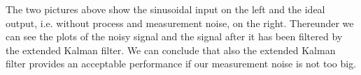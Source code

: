 The two pictures above show the sinusoidal input on the left and the ideal output, i.e. without process and measurement noise, on the right. Thereunder we can see the plots of the noisy signal and the signal after it has been filtered by the extended Kalman filter. We can conclude that also the extended Kalman filter provides an acceptable performance if our measurement noise is not too big.



